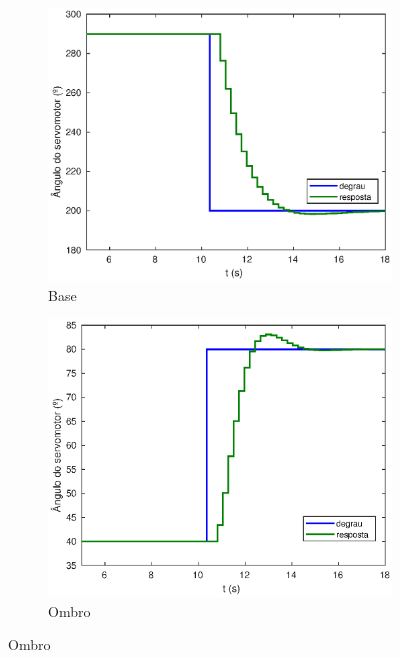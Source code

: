 \begin{figure}[h!]
  
  \centering
  \begin{subfigure}{.5\textwidth}
    \centering
    \includegraphics[width = 1\columnwidth]{Imagens/base_hilFase2}
    \caption{Base}
    \label{fig:base_hilFase2}
  \end{subfigure}%
  \begin{subfigure}{.5\textwidth}
    \centering
    \includegraphics[width = 1\columnwidth]{Imagens/shoulder_hilFase2}
    \caption{Ombro}
    \label{fig:shoulder_hilFase2}

\end{subfigure}
\end{figure}
